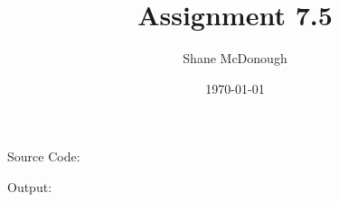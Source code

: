 \documentclass{article}
\title{Assignment 7.5}
\author{Shane McDonough}
\date{\today}
\begin{document}
    \maketitle
    Source Code:
    

    Output:
    
\end{document}
